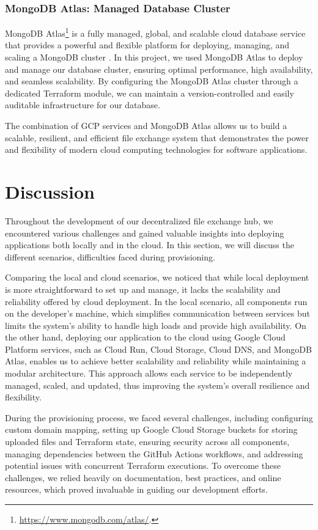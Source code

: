 \documentclass[a4paper,fleqn]{cas-dc}
\begin{document}
\subsubsection{MongoDB Atlas: Managed Database Cluster}

MongoDB Atlas\footnote{ \url{https://www.mongodb.com/atlas/}.} is a fully managed, global, and scalable cloud database service that provides a powerful and flexible platform for deploying, managing, and scaling a MongoDB cluster \cite{Huang2015}. In this project, we used MongoDB Atlas to deploy and manage our database cluster, ensuring optimal performance, high availability, and seamless scalability. By configuring the MongoDB Atlas cluster through a dedicated Terraform module, we can maintain a version-controlled and easily auditable infrastructure for our database.

The combination of GCP services and MongoDB Atlas allows us to build a scalable, resilient, and efficient file exchange system that demonstrates the power and flexibility of modern cloud computing technologies for software applications.

\section{Discussion} \label{sec:discussion}

Throughout the development of our decentralized file exchange hub, we encountered various challenges and gained valuable insights into deploying applications both locally and in the cloud. In this section, we will discuss the different scenarios, difficulties faced during provisioning.

Comparing the local and cloud scenarios, we noticed that while local deployment is more straightforward to set up and manage, it lacks the scalability and reliability offered by cloud deployment. In the local scenario, all components run on the developer's machine, which simplifies communication between services but limits the system's ability to handle high loads and provide high availability. On the other hand, deploying our application to the cloud using Google Cloud Platform services, such as Cloud Run, Cloud Storage, Cloud DNS, and MongoDB Atlas, enables us to achieve better scalability and reliability while maintaining a modular architecture. This approach allows each service to be independently managed, scaled, and updated, thus improving the system's overall resilience and flexibility.

During the provisioning process, we faced several challenges, including configuring custom domain mapping, setting up Google Cloud Storage buckets for storing uploaded files and Terraform state, ensuring security across all components, managing dependencies between the GitHub Actions workflows, and addressing potential issues with concurrent Terraform executions. To overcome these challenges, we relied heavily on documentation, best practices, and online resources, which proved invaluable in guiding our development efforts.
\end{document}

